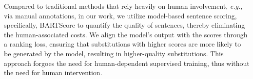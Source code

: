 Compared to traditional methods that rely heavily on human involvement, {\em e.g.}, via manual annotations, in our work, we utilize model-based sentence scoring, specifically, BARTScore to quantify the quality of sentences, thereby eliminating the human-associated costs.
We align the model’s output with the scores through a ranking loss, ensuring that substitutions with higher scores are more likely to be generated by the model, resulting in higher-quality substitutions.
This approach forgoes the need for human-dependent supervised training, thus without the need for human intervention.